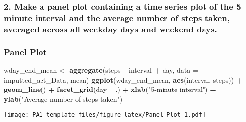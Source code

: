 \documentclass[]{article}
\newenvironment{Shaded}{\begin{snugshade}}{\end{snugshade}}
\newcommand{\KeywordTok}[1]{\textcolor[rgb]{0.13,0.29,0.53}{\textbf{#1}}}
\newcommand{\DataTypeTok}[1]{\textcolor[rgb]{0.13,0.29,0.53}{#1}}
\newcommand{\StringTok}[1]{\textcolor[rgb]{0.31,0.60,0.02}{#1}}
\newcommand{\ControlFlowTok}[1]{\textcolor[rgb]{0.13,0.29,0.53}{\textbf{#1}}}
\newcommand{\OperatorTok}[1]{\textcolor[rgb]{0.81,0.36,0.00}{\textbf{#1}}}
\newcommand{\NormalTok}[1]{#1}
\begin{document}
\begin{Shaded}
\end{Shaded}

\subsubsection{2. Make a panel plot containing a time series plot of the
5 minute interval and the average number of steps taken, averaged across
all weekday days and weekend
days.}\label{make-a-panel-plot-containing-a-time-series-plot-of-the-5-minute-interval-and-the-average-number-of-steps-taken-averaged-across-all-weekday-days-and-weekend-days.}

\subsubsection{Panel Plot}\label{panel-plot}

\begin{Shaded}
\begin{Highlighting}[]
\NormalTok{wday_end_mean <-}\StringTok{ }\KeywordTok{aggregate}\NormalTok{(steps }\OperatorTok{~}\StringTok{ }\NormalTok{interval }\OperatorTok{+}\StringTok{ }\NormalTok{day, }\DataTypeTok{data =}\NormalTok{ imputted_act_Data, mean)}
\KeywordTok{ggplot}\NormalTok{(wday_end_mean, }\KeywordTok{aes}\NormalTok{(interval, steps)) }\OperatorTok{+}\StringTok{ }
\StringTok{  }\KeywordTok{geom_line}\NormalTok{() }\OperatorTok{+}\StringTok{ }
\StringTok{  }\KeywordTok{facet_grid}\NormalTok{(day }\OperatorTok{~}\StringTok{ }\NormalTok{.) }\OperatorTok{+}
\StringTok{  }\KeywordTok{xlab}\NormalTok{(}\StringTok{"5-minute interval"}\NormalTok{) }\OperatorTok{+}\StringTok{ }
\StringTok{  }\KeywordTok{ylab}\NormalTok{(}\StringTok{"Average number of steps taken"}\NormalTok{)}
\end{Highlighting}
\end{Shaded}

\texttt{[image: PA1\_template\_files/figure-latex/Panel\_Plot-1.pdf]}
\end{document}
